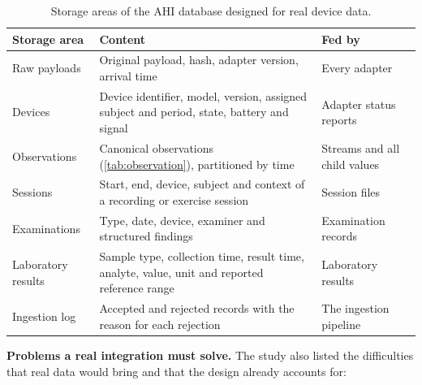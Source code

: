 \begin{table}[htbp]
\centering
\vspace{0.8em}
\caption{Storage areas of the AHI database designed for real device data.}
\label{tab:integration-db}
\footnotesize
\begin{tabular}{p{3.4cm}p{6.6cm}p{4.0cm}}
\hline
\textbf{Storage area} & \textbf{Content} & \textbf{Fed by} \\
\hline
Raw payloads & Original payload, hash, adapter version, arrival time & Every adapter \\
Devices & Device identifier, model, version, assigned subject and period, state, battery and signal & Adapter status reports \\
Observations & Canonical observations (\ref{tab:observation}), partitioned by time & Streams and all child values \\
Sessions & Start, end, device, subject and context of a recording or exercise session & Session files \\
Examinations & Type, date, device, examiner and structured findings & Examination records \\
Laboratory results & Sample type, collection time, result time, analyte, value, unit and reported reference range & Laboratory results \\
Ingestion log & Accepted and rejected records with the reason for each rejection & The ingestion pipeline \\
\hline
\end{tabular}
\vspace{1.2em}
\end{table}

\medskip\noindent\textbf{Problems a real integration must solve.} The study also listed the difficulties that real data would bring and that the design already accounts for:

